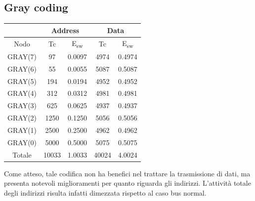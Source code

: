 \documentclass[11pt,  english, makeidx, a4paper, titlepage, oneside]{book}
\begin{document}
\subsection{Gray coding}
\begin{center}
	\begin{tabular}{|c|c|c||c|c|}
	\hline
	& \multicolumn{2}{|c||}{Address} & \multicolumn{2}{|c|}{Data}\\
	\hline
	Nodo & Tc & E\textsubscript{sw} & Tc & E\textsubscript{sw} \\
	\hline
	GRAY(7) & 97 & 0.0097 & 4974 & 0.4974\\
	 \hline
	GRAY(6) & 55 & 0.0055 & 5087 & 0.5087\\
	\hline
	GRAY(5) & 194 & 0.0194 & 4952 & 0.4952\\
	\hline
	GRAY(4) & 312 & 0.0312 & 4981 & 0.4981\\
	\hline
	GRAY(3) & 625 & 0.0625 & 4937 & 0.4937\\
	\hline
	GRAY(2) & 1250 & 0.1250 & 5056 & 0.5056\\
	\hline
	GRAY(1) & 2500 & 0.2500 & 4962 & 0.4962\\
	\hline
	GRAY(0) & 5000 & 0.5000 & 5075 & 0.5075\\
	\hline
	Totale & 10033 & 1.0033 & 40024 & 4.0024\\
	\hline
	\end{tabular}	
\end{center}
\vspace{0.3cm}
Come atteso, tale codifica non ha benefici nel trattare la trasmissione di dati, ma presenta notevoli miglioramenti per quanto riguarda gli indirizzi. L'attività totale degli indirizzi risulta infatti dimezzata rispetto al caso bus normal.
\end{document}
